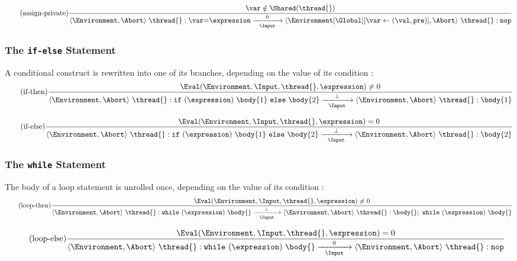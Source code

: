 \begin{equation*}
	\tag{assign-private}
	\label{forec:assign-private}
	\frac{
			\var \notin \Shared(\thread{})
		}{
			\langle \Environment, \Abort \rangle ~ \thread{}:\var \mathtt{=} \expression
				\xrightarrow[~~\Input~~]{0} 
			\langle \Environment[\Global][\var \gets (\val, \texttt{pre})], \Abort \rangle ~ \thread{}:\mathtt{nop}
		}
\end{equation*}

\subsubsection{The \texttt{if-else} Statement}
A conditional construct is rewritten into one of its branches, depending on 
the value of its condition \expression{}:
\begin{equation*}
	\tag{if-then}
	\label{forec:if-then}
	\frac{
			\Eval(\Environment, \Input, \thread{}, \expression) \neq 0
		}{
			\langle \Environment, \Abort \rangle ~ \thread{}:\mathtt{if}~(\expression)~\body{1}~\mathtt{else}~\body{2}
				\xrightarrow[~~\Input~~]{\bot} 
			\langle \Environment, \Abort \rangle ~ \thread{}:\body{1}
		}
\end{equation*}

\begin{equation*}
	\tag{if-else}
	\label{forec:if-else}
	\frac{
			\Eval(\Environment, \Input, \thread{}, \expression) = 0
		}{
			\langle \Environment, \Abort \rangle ~ \thread{}:\mathtt{if}~(\expression)~\body{1}~\mathtt{else}~\body{2}
				\xrightarrow[~~\Input~~]{\bot} 
			\langle \Environment, \Abort \rangle ~ \thread{}:\body{2}
		}
\end{equation*}

\subsubsection{The \texttt{while} Statement}
The body of a loop statement is unrolled once, depending 
on the value of its condition \expression{}:
\begin{equation*}
	\tag{loop-then}
	\label{forec:loop-then}
	\frac{
			\Eval(\Environment, \Input, \thread{}, \expression) \neq 0
		}{
			\langle \Environment, \Abort \rangle ~ \thread{}:\mathtt{while}~(\expression)~\body{}
				\xrightarrow[~~\Input~~]{\bot} 
			\langle \Environment, \Abort \rangle ~ \thread{}:\body{};~\mathtt{while}~(\expression)~\body{}
		}
\end{equation*}

\begin{equation*}
	\tag{loop-else}
	\label{forec:loop-else}
	\frac{
			\Eval(\Environment, \Input, \thread{}, \expression) = 0
		}{
			\langle \Environment, \Abort \rangle ~ \thread{}:\mathtt{while}~(\expression)~\body{}
				\xrightarrow[~~\Input~~]{0} 
			\langle \Environment, \Abort \rangle ~ \thread{}:\mathtt{nop}
		}
\end{equation*}

